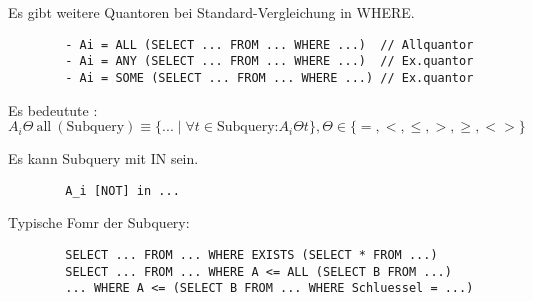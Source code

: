 \begin{remark}
    Es gibt weitere Quantoren bei Standard-Vergleichung in WHERE.
    \begin{verbatim}
        - Ai = ALL (SELECT ... FROM ... WHERE ...)  // Allquantor
        - Ai = ANY (SELECT ... FROM ... WHERE ...)  // Ex.quantor
        - Ai = SOME (SELECT ... FROM ... WHERE ...) // Ex.quantor
    \end{verbatim}
    Es bedeutute :\(A_i \Theta \  \text{all}\ (\text{Subquery})\equiv \{...\mid \forall t \in \text{Subquery:}A_i \Theta t\}, \Theta\in\{=,<,\leq,>,\geq,<>\}\)
\end{remark}

\begin{remark}
    Es kann Subquery mit IN sein.
    \begin{verbatim}
        A_i [NOT] in ...
    \end{verbatim}
\end{remark}

\begin{example}Typische Fomr der Subquery:
    \begin{verbatim}
        SELECT ... FROM ... WHERE EXISTS (SELECT * FROM ...)
        SELECT ... FROM ... WHERE A <= ALL (SELECT B FROM ...)
        ... WHERE A <= (SELECT B FROM ... WHERE Schluessel = ...)
    \end{verbatim}
\end{example}